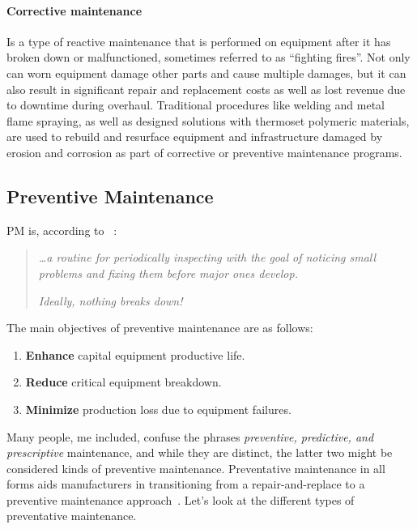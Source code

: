 \paragraph{Corrective maintenance} Is a type of reactive maintenance that is performed on equipment after it has broken down or malfunctioned,
sometimes referred to as ``fighting fires''. Not only can worn equipment damage other parts and cause multiple damages, but it can also result in significant repair and
replacement costs as well as lost revenue due to downtime during overhaul. Traditional procedures like welding and metal flame spraying,
as well as designed solutions with thermoset polymeric materials, are used to rebuild and resurface equipment and infrastructure
damaged by erosion and corrosion as part of corrective or preventive maintenance programs.

\subsection{Preventive Maintenance}
\ac{PM} is, according to \citeauthor{Article:nyt_hinds_1985_preventive}~\cite{Article:nyt_hinds_1985_preventive}:
\begin{quote}
    \textit{\dots a routine for periodically inspecting with the goal of noticing small problems and fixing them before major ones develop.}

    \textit{Ideally, nothing breaks down!}
\end{quote}

The main objectives of preventive maintenance are as follows:
\begin{enumerate}
    \item \textbf{Enhance} capital equipment productive life.
    \item \textbf{Reduce} critical equipment breakdown.
    \item \textbf{Minimize} production loss due to equipment failures.
\end{enumerate}
Many people, me included, confuse the phrases \textit{preventive, predictive, and prescriptive} maintenance, and while they are distinct, the latter two might
be considered kinds of preventive maintenance. Preventative maintenance in all forms aids manufacturers in transitioning from a
repair-and-replace to a preventive maintenance approach~\cite{Misc:trout_2019_preventive}. Let's look at the different types of preventative maintenance.

